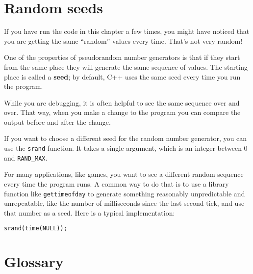 \section{Random seeds}

If you have run the code in this chapter a few times, you might
have noticed that you are getting the same ``random'' values
every time.  That's not very random!

One of the properties of pseudorandom number generators is that
if they start from the same place they will generate
the same sequence of values.  The starting place is called
a {\bf seed}; by default, C++ uses
the same seed every time you run the program.

While you are debugging, it is often helpful to
see the same sequence over and over.  That way, when you make
a change to the program you can compare the output before and
after the change.

If you want to choose a different seed for the random number
generator, you can use the {\tt srand} function.  It takes
a single argument, which is an integer between 0 and {\tt RAND\_MAX}.

For many applications, like games, you want to see a different
random sequence every time the program runs.  A common way to
do that is to use a library function like {\tt gettimeofday}
to generate something reasonably unpredictable
and unrepeatable, like the number of milliseconds since the
last second tick, and use that number as a seed.  Here is a typical 
implementation:
\begin{lstlisting}
srand(time(NULL));
\end{lstlisting}



\section{Glossary}

